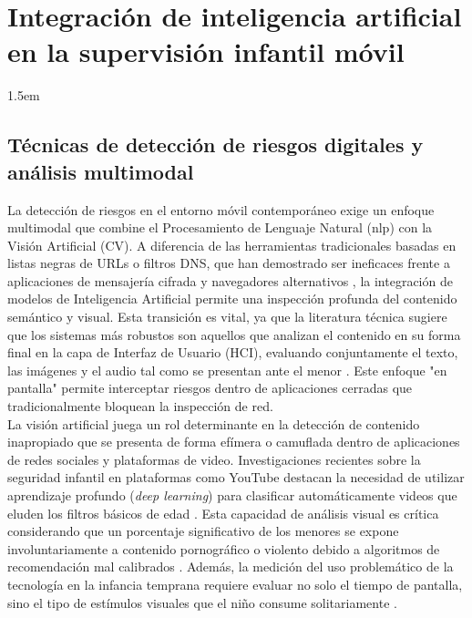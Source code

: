\chapter{Integración de inteligencia artificial en la supervisión infantil móvil}
\label{chap:ia-supervision-movil}

\insertminitoc
\parindent1.5em

\section{Técnicas de detección de riesgos digitales y análisis multimodal}

La detección de riesgos en el entorno móvil contemporáneo exige un enfoque multimodal que combine el Procesamiento de Lenguaje Natural (\gls{nlp}) con la Visión Artificial (CV). A diferencia de las herramientas tradicionales basadas en listas negras de URLs o filtros DNS, que han demostrado ser ineficaces frente a aplicaciones de mensajería cifrada y navegadores alternativos \cite{rojas_technical_2025}, la integración de modelos de Inteligencia Artificial permite una inspección profunda del contenido semántico y visual. Esta transición es vital, ya que la literatura técnica sugiere que los sistemas más robustos son aquellos que analizan el contenido en su forma final en la capa de Interfaz de Usuario (HCI), evaluando conjuntamente el texto, las imágenes y el audio tal como se presentan ante el menor \cite{jevremovic_keeping_2021}. Este enfoque "en pantalla" permite interceptar riesgos dentro de aplicaciones cerradas que tradicionalmente bloquean la inspección de red.\\


La visión artificial juega un rol determinante en la detección de contenido inapropiado que se presenta de forma efímera o camuflada dentro de aplicaciones de redes sociales y plataformas de video. Investigaciones recientes sobre la seguridad infantil en plataformas como YouTube destacan la necesidad de utilizar aprendizaje profundo (\textit{deep learning}) para clasificar automáticamente videos que eluden los filtros básicos de edad \cite{alqahtani_childrens_2023}. Esta capacidad de análisis visual es crítica considerando que un porcentaje significativo de los menores se expone involuntariamente a contenido pornográfico o violento debido a algoritmos de recomendación mal calibrados \cite{yusuf_lets_2023}. Además, la medición del uso problemático de la tecnología en la infancia temprana requiere evaluar no solo el tiempo de pantalla, sino el tipo de estímulos visuales que el niño consume solitariamente \cite{selak_problematic_2025}.\\

